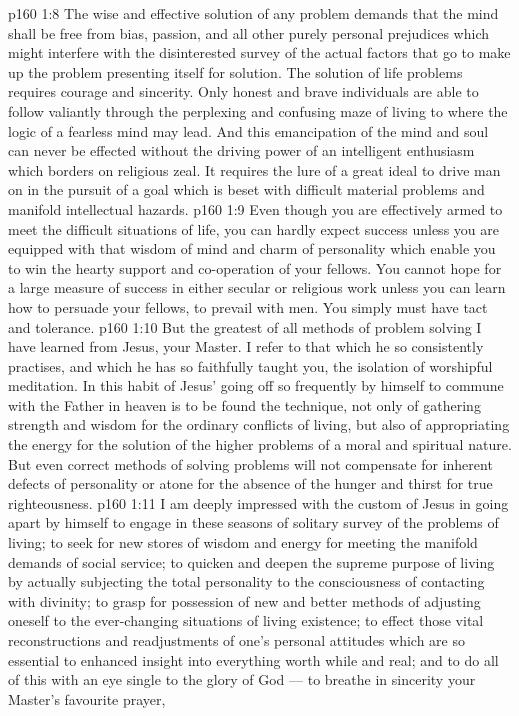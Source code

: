 \vs p160 1:8 The wise and effective solution of any problem demands that the mind shall be free from bias, passion, and all other purely personal prejudices which might interfere with the disinterested survey of the actual factors that go to make up the problem presenting itself for solution. The solution of life problems requires courage and sincerity. Only honest and brave individuals are able to follow valiantly through the perplexing and confusing maze of living to where the logic of a fearless mind may lead. And this emancipation of the mind and soul can never be effected without the driving power of an intelligent enthusiasm which borders on religious zeal. It requires the lure of a great ideal to drive man on in the pursuit of a goal which is beset with difficult material problems and manifold intellectual hazards.
\vs p160 1:9 Even though you are effectively armed to meet the difficult situations of life, you can hardly expect success unless you are equipped with that wisdom of mind and charm of personality which enable you to win the hearty support and co\hyp{}operation of your fellows. You cannot hope for a large measure of success in either secular or religious work unless you can learn how to persuade your fellows, to prevail with men. You simply must have tact and tolerance.
\vs p160 1:10 \pc But the greatest of all methods of problem solving I have learned from Jesus, your Master. I refer to that which he so consistently practises, and which he has so faithfully taught you, the isolation of worshipful meditation. In this habit of Jesus’ going off so frequently by himself to commune with the Father in heaven is to be found the technique, not only of gathering strength and wisdom for the ordinary conflicts of living, but also of appropriating the energy for the solution of the higher problems of a moral and spiritual nature. But even correct methods of solving problems will not compensate for inherent defects of personality or atone for the absence of the hunger and thirst for true righteousness.
\vs p160 1:11 I am deeply impressed with the custom of Jesus in going apart by himself to engage in these seasons of solitary survey of the problems of living; to seek for new stores of wisdom and energy for meeting the manifold demands of social service; to quicken and deepen the supreme purpose of living by actually subjecting the total personality to the consciousness of contacting with divinity; to grasp for possession of new and better methods of adjusting oneself to the ever\hyp{}changing situations of living existence; to effect those vital reconstructions and readjustments of one’s personal attitudes which are so essential to enhanced insight into everything worth while and real; and to do all of this with an eye single to the glory of God --- to breathe in sincerity your Master’s favourite prayer, 
